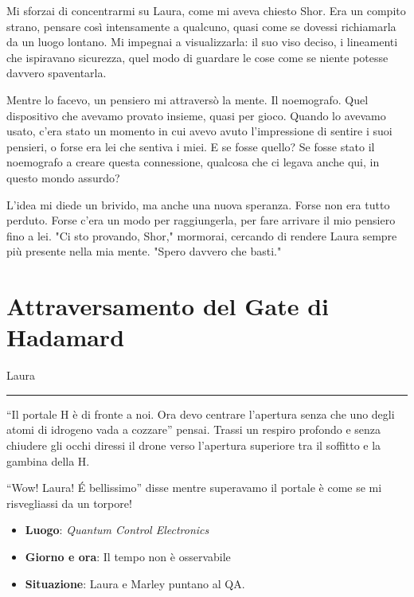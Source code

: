 Mi sforzai di concentrarmi su Laura, come mi aveva chiesto Shor. Era un compito strano, pensare così intensamente a qualcuno, quasi come se dovessi richiamarla da un luogo lontano. Mi impegnai a visualizzarla: il suo viso deciso, i lineamenti che ispiravano sicurezza, quel modo di guardare le cose come se niente potesse davvero spaventarla.

Mentre lo facevo, un pensiero mi attraversò la mente. Il noemografo. Quel dispositivo che avevamo provato insieme, quasi per gioco. Quando lo avevamo usato, c'era stato un momento in cui avevo avuto l’impressione di sentire i suoi pensieri, o forse era lei che sentiva i miei. E se fosse quello? Se fosse stato il noemografo a creare questa connessione, qualcosa che ci legava anche qui, in questo mondo assurdo?

L’idea mi diede un brivido, ma anche una nuova speranza. Forse non era tutto perduto. Forse c'era un modo per raggiungerla, per fare arrivare il mio pensiero fino a lei. "Ci sto provando, Shor," mormorai, cercando di rendere Laura sempre più presente nella mia mente. "Spero davvero che basti."

\section{Attraversamento del Gate di Hadamard}


\vspace{1em}
\begin{center}Laura\end{center}
\hrule
\vspace{1em}

\enquote{Il portale H è di fronte a noi. Ora devo centrare l'apertura senza che uno degli atomi di idrogeno vada a cozzare} pensai.
Trassi un respiro profondo e senza chiudere gli occhi diressi il drone verso l'apertura superiore tra il soffitto e la gambina della H.



\begin{dialogue}
 \enquote{Wow! Laura! \'E bellissimo} disse mentre superavamo il portale {è come se mi risvegliassi da un torpore!}
\end{dialogue}


\begin{tcolorbox}[colback=gray!5,colframe=gray!80,title=\textbf{Scheda Informativa}]
\begin{itemize}
    \item \textbf{Luogo}: \emph{Quantum Control Electronics}
    \item \textbf{Giorno e ora}: Il tempo non è osservabile
    \item \textbf{Situazione}: Laura e Marley puntano al QA.
\end{itemize}
\end{tcolorbox}


